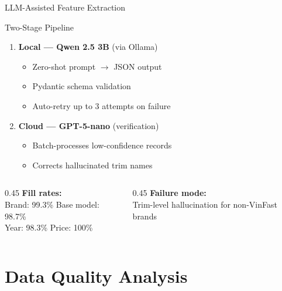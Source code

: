 \documentclass[aspectratio=169]{beamer}
\begin{document}
\begin{frame}{LLM-Assisted Feature Extraction}
  \begin{block}{Two-Stage Pipeline}
    \begin{enumerate}
      \item \textbf{Local --- Qwen 2.5 3B} (via Ollama)
        \begin{itemize}
          \item Zero-shot prompt $\to$ JSON output
          \item Pydantic schema validation
          \item Auto-retry up to 3 attempts on failure
        \end{itemize}
      \item \textbf{Cloud --- GPT-5-nano} (verification)
        \begin{itemize}
          \item Batch-processes low-confidence records
          \item Corrects hallucinated trim names
        \end{itemize}
    \end{enumerate}
  \end{block}

  \vspace{0.5em}
  \begin{columns}[T]
    \begin{column}{0.45\textwidth}
      \textbf{Fill rates:}\\[0.3em]
      \small
      Brand: 99.3\% \quad Base model: 98.7\%\\
      Year: 98.3\% \quad Price: 100\%
    \end{column}
    \begin{column}{0.45\textwidth}
      \textbf{Failure mode:}\\[0.3em]
      \small
      Trim-level hallucination for non-VinFast brands
    \end{column}
  \end{columns}
\end{frame}

\section{Data Quality Analysis}
\end{document}
